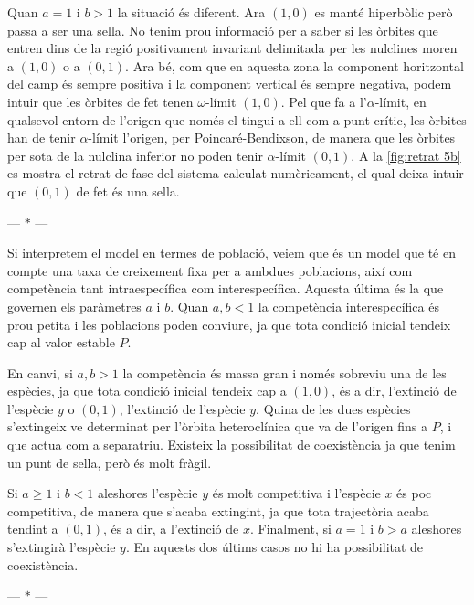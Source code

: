 \documentclass[12pt]{article}
\numberwithin{table}{section}
\numberwithin{equation}{section}
\numberwithin{figure}{section}
\newcommand{\parbreak}{
	\begin{center}
		--- $\ast$ ---
	\end{center} 
}
\begin{document}
Quan \( a = 1 \) i \( b > 1 \) la situació és diferent. Ara \( (1,0) \) es manté hiperbòlic però passa a ser una sella. No tenim prou informació per a saber si les òrbites que entren dins de la regió positivament invariant delimitada per les nulclines moren a \( (1,0) \) o a \( (0,1) \). Ara bé, com que en aquesta zona la component horitzontal del camp és sempre positiva i la component vertical és sempre negativa, podem intuir que les òrbites de fet tenen \( \omega \)-límit \( (1,0) \). Pel que fa a l'\( \alpha \)-límit, en qualsevol entorn de l'origen que només el tingui a ell com a punt crític, les òrbites han de tenir \( \alpha \)-límit l'origen, per Poincaré-Bendixson, de manera que les òrbites per sota de la nulclina inferior no poden tenir \( \alpha \)-límit \( (0,1) \). A la \cref{fig:retrat 5b} es mostra el retrat de fase del sistema calculat numèricament, el qual deixa intuir que \( (0,1) \) de fet és una sella.

\parbreak 

Si interpretem el model en termes de població, veiem que és un model que té en compte una taxa de creixement fixa per a ambdues poblacions, així com competència tant intraespecífica com interespecífica. Aquesta última és la que governen els paràmetres \( a \) i \( b \). Quan \( a,b < 1 \) la competència interespecífica és prou petita i les poblacions poden conviure, ja que tota condició inicial tendeix cap al valor estable \( P \). 

En canvi, si \( a, b > 1 \) la competència és massa gran i només sobreviu una de les espècies, ja que tota condició inicial tendeix cap a \( (1,0) \), és a dir, l'extinció de l'espècie \( y \) o \( (0,1) \), l'extinció de l'espècie \( y \). Quina de les dues espècies s'extingeix ve determinat per l'òrbita heteroclínica que va de l'origen fins a \( P \), i que actua com a separatriu. Existeix la possibilitat de coexistència ja que tenim un punt de sella, però és molt fràgil. 

Si \( a \geq 1 \) i \( b < 1 \) aleshores l'espècie \( y \) és molt competitiva i l'espècie \( x \) és poc competitiva, de manera que s'acaba extingint, ja que tota trajectòria acaba tendint a \( (0,1) \), és a dir, a l'extinció de \( x \). Finalment, si	\( a = 1 \) i \( b > a \) aleshores s'extingirà l'espècie \( y \). En aquests dos últims casos no hi ha possibilitat de coexistència. 

\parbreak
\end{document}
